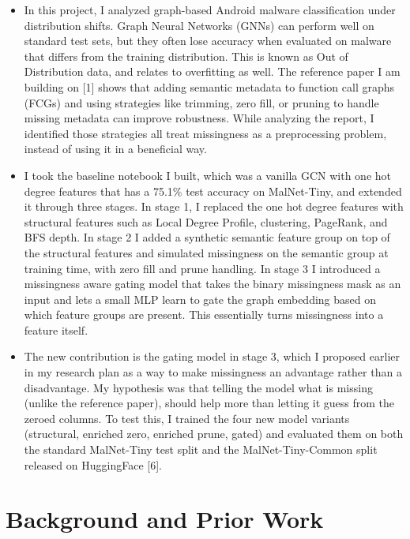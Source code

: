 \documentclass[12pt]{article}
\begin{document}
\begin{itemize}
    \item In this project, I analyzed graph-based Android malware classification under distribution shifts. Graph Neural Networks (GNNs) can perform well on standard test sets, but they often lose accuracy when evaluated on malware that differs from the training distribution. This is known as Out of Distribution data, and relates to overfitting as well. The reference paper I am building on [1] shows that adding semantic metadata to function call graphs (FCGs) and using strategies like trimming, zero fill, or pruning to handle missing metadata can improve robustness. While analyzing the report, I identified those strategies all treat missingness as a preprocessing problem, instead of using it in a beneficial way. 
    \item I took the baseline notebook I built, which was a vanilla GCN with one hot degree features that has a 75.1\% test accuracy on MalNet-Tiny, and extended it through three stages. In stage 1, I replaced the one hot degree features with structural features such as Local Degree Profile, clustering, PageRank, and BFS depth. In stage 2 I added a synthetic semantic feature group on top of the structural features and simulated missingness on the semantic group at training time, with zero fill and prune handling. In stage 3 I introduced a missingness aware gating model that takes the binary missingness mask as an input and lets a small MLP learn to gate the graph embedding based on which feature groups are present. This essentially turns missingness into a feature itself. 
    \item The new contribution is the gating model in stage 3, which I proposed earlier in my research plan as a way to make missingness an advantage rather than a disadvantage. My hypothesis was that telling the model what is missing (unlike the reference paper), should help more than letting it guess from the zeroed columns. To test this, I trained the four new model variants (structural, enriched zero, enriched prune, gated) and evaluated them on both the standard MalNet-Tiny test split and the MalNet-Tiny-Common split released on HuggingFace [6].
\end{itemize}

\section{Background and Prior Work}
\end{document}
